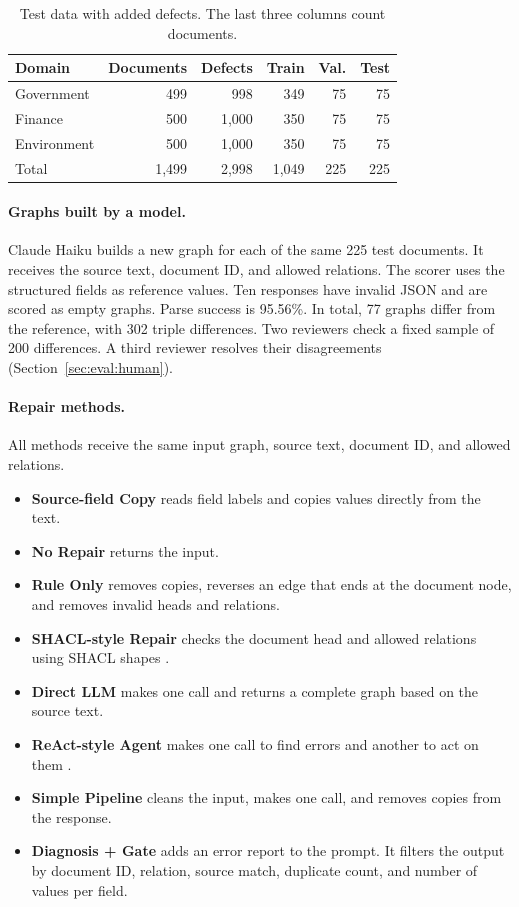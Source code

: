 \begin{table}[t]
\centering
\caption{Test data with added defects. The last three columns count documents.}
\label{tab:repair_benchmark}
\small
\begin{tabular}{l r r r r r}
\toprule
Domain & Documents & Defects & Train & Val. & Test \\
\midrule
Government & 499 & 998 & 349 & 75 & 75 \\
Finance & 500 & 1,000 & 350 & 75 & 75 \\
Environment & 500 & 1,000 & 350 & 75 & 75 \\
\midrule
Total & 1,499 & 2,998 & 1,049 & 225 & 225 \\
\bottomrule
\end{tabular}
\end{table}

\paragraph{Graphs built by a model.}
Claude Haiku builds a new graph for each of the same 225 test documents.
It receives the source text, document ID, and allowed relations.
The scorer uses the structured fields as reference values. Ten responses
have invalid JSON and are scored as empty graphs. Parse success is 95.56\%.
In total, 77 graphs differ from the reference, with 302 triple differences.
Two reviewers check a fixed sample of 200 differences. A third reviewer
resolves their disagreements (Section~\ref{sec:eval:human}).

\paragraph{Repair methods.}
All methods receive the same input graph, source text, document ID, and
allowed relations.
\begin{itemize}
    \item \textbf{Source-field Copy} reads field labels and copies values
    directly from the text.
    \item \textbf{No Repair} returns the input.
    \item \textbf{Rule Only} removes copies, reverses an edge that ends at
    the document node, and removes invalid heads and relations.
    \item \textbf{SHACL-style Repair} checks the document head and allowed
    relations using SHACL shapes \citep{ref_shacl2017}.
    \item \textbf{Direct LLM} makes one call and returns a complete graph
    based on the source text.
    \item \textbf{ReAct-style Agent} makes one call to find errors and
    another to act on them \citep{ref_yao2023react}.
    \item \textbf{Simple Pipeline} cleans the input, makes one call,
    and removes copies from the response.
    \item \textbf{Diagnosis + Gate} adds an error report to the prompt.
    It filters the output by document ID, relation, source match, duplicate
    count, and number of values per field.
\end{itemize}

